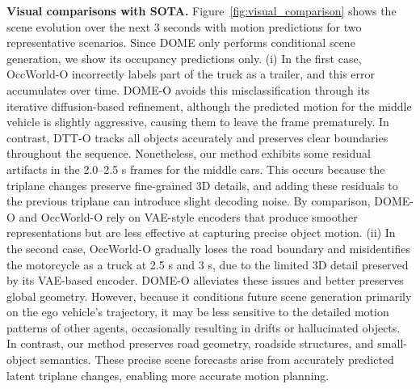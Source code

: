 \documentclass[11pt,a4paper]{article}
\begin{document}
\textbf{Visual comparisons with SOTA.}
Figure~\ref{fig:visual_comparison} shows the scene evolution over the next 3 seconds with motion predictions for two representative scenarios.
Since DOME only performs conditional scene generation, we show its occupancy predictions only.
(i) In the first case, OccWorld-O incorrectly labels part of the truck as a trailer, and this error accumulates over time.
DOME-O avoids this misclassification through its iterative diffusion-based refinement, although the predicted motion for the middle vehicle is slightly aggressive, causing them to leave the frame prematurely.
In contrast, DTT-O tracks all objects accurately and preserves clear boundaries throughout the sequence.
Nonetheless, our method exhibits some residual artifacts in the 2.0--2.5 s frames for the middle cars.
This occurs because the triplane changes preserve fine-grained 3D details, and adding these residuals to the previous triplane can introduce slight decoding noise.
By comparison, DOME-O and OccWorld-O rely on VAE-style encoders that produce smoother representations but are less effective at capturing precise object motion.
(ii) In the second case, OccWorld-O gradually loses the road boundary and misidentifies the motorcycle as a truck at 2.5 s and 3 s, due to the limited 3D detail preserved by its VAE-based encoder.
DOME-O alleviates these issues and better preserves global geometry.
However, because it conditions future scene generation primarily on the ego vehicle's trajectory, it may be less sensitive to the detailed motion patterns of other agents, occasionally resulting in drifts or hallucinated objects.
In contrast, our method preserves road geometry, roadside structures, and small-object semantics.
These precise scene forecasts arise from accurately predicted latent triplane changes, enabling more accurate motion planning.
\end{document}
